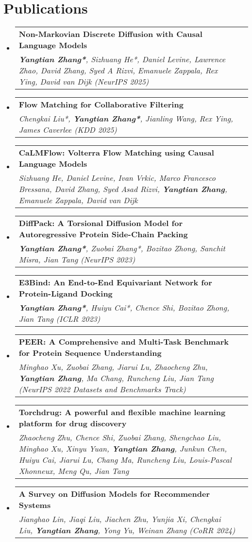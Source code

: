 \documentclass[letterpaper,11pt]{article}
\makeatletter
\newcommand{\resumeSubHeadingListStart}{\begin{itemize}[leftmargin=0.15in, label={}]}
\newcommand{\resumeSubHeadingListEnd}{\end{itemize}}
\newcommand{\resumePublication}[2]{
  \vspace{-2pt}\item
    \begin{tabular*}{0.97\textwidth}[t]{p{0.9\textwidth}@{\extracolsep{\fill}}r}
      \textbf{#1} & \\
      \textit{\small#2} & \\
    \end{tabular*}\vspace{-2pt}
}
\makeatother
\begin{document}
\section{Publications}
\resumeSubHeadingListStart
    \resumePublication{Non-Markovian Discrete Diffusion with Causal Language Models}
    {\textbf{Yangtian Zhang*}, Sizhuang He*, Daniel Levine, Lawrence Zhao, David Zhang, Syed A Rizvi, Emanuele Zappala, Rex Ying, David van Dijk (NeurIPS 2025)}

    \resumePublication{Flow Matching for Collaborative Filtering}
    {Chengkai Liu*, \textbf{Yangtian Zhang*}, Jianling Wang, Rex Ying, James Caverlee (KDD 2025)}

    \resumePublication{CaLMFlow: Volterra Flow Matching using Causal Language Models}
    {Sizhuang He, Daniel Levine, Ivan Vrkic, Marco Francesco Bressana, David Zhang, Syed Asad Rizvi, \textbf{Yangtian Zhang}, Emanuele Zappala, David van Dijk }
    
    \resumePublication{DiffPack: A Torsional Diffusion Model for Autoregressive Protein Side-Chain Packing}
    {\textbf{Yangtian Zhang*}, Zuobai Zhang*, Bozitao Zhong, Sanchit Misra, Jian Tang (NeurIPS 2023)}
    
    \resumePublication{E3Bind: An End-to-End Equivariant Network for Protein-Ligand Docking}
    {\textbf{Yangtian Zhang*}, Huiyu Cai*, Chence Shi, Bozitao Zhong, Jian Tang (ICLR 2023)}



    \resumePublication{PEER: A Comprehensive and Multi-Task Benchmark for Protein Sequence Understanding}
    {Minghao Xu, Zuobai Zhang, Jiarui Lu, Zhaocheng Zhu, \textbf{Yangtian Zhang}, Ma Chang, Runcheng Liu, Jian Tang (NeurIPS 2022 Datasets and Benchmarks Track)}

    \resumePublication{Torchdrug: A powerful and flexible machine learning platform for drug discovery}
    {Zhaocheng Zhu, Chence Shi, Zuobai Zhang, Shengchao Liu, Minghao Xu, Xinyu Yuan, \textbf{Yangtian Zhang}, Junkun Chen, Huiyu Cai, Jiarui Lu, Chang Ma, Runcheng Liu, Louis-Pascal Xhonneux, Meng Qu, Jian Tang }


    \resumePublication{A Survey on Diffusion Models for Recommender Systems}
    {Jianghao Lin, Jiaqi Liu, Jiachen Zhu, Yunjia Xi, Chengkai Liu, \textbf{Yangtian Zhang}, Yong Yu, Weinan Zhang (CoRR 2024)}



\resumeSubHeadingListEnd


\end{document}
